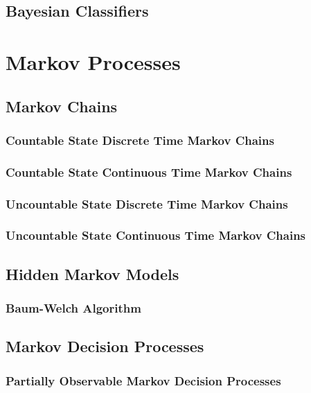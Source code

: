 \documentclass[11pt]{report} %
\begin{document}
\section{Bayesian Classifiers}

\chapter{Markov Processes}

\section{Markov Chains}

\subsection{Countable State Discrete Time Markov Chains}

\subsection{Countable State Continuous Time Markov Chains}

\subsection{Uncountable State Discrete Time Markov Chains}

\subsection{Uncountable State Continuous Time Markov Chains}

\section{Hidden Markov Models}

\subsection{Baum-Welch Algorithm}

\section{Markov Decision Processes}

\subsection{Partially Observable Markov Decision Processes}
\end{document}
